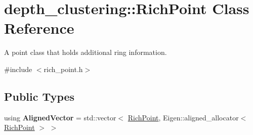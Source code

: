 \hypertarget{classdepth__clustering_1_1RichPoint}{}\section{depth\+\_\+clustering\+:\+:Rich\+Point Class Reference}
\label{classdepth__clustering_1_1RichPoint}


A point class that holds additional ring information.  




{\ttfamily \#include $<$rich\+\_\+point.\+h$>$}

\subsection*{Public Types}
\begin{DoxyCompactItemize}
\item 
\mbox{\label{classdepth__clustering_1_1RichPoint_a0c9f8f2afdb4f77c95cc1f6d17059d99}} 
using {\bfseries Aligned\+Vector} = std\+::vector$<$ \hyperlink{classdepth__clustering_1_1RichPoint}{Rich\+Point}, Eigen\+::aligned\+\_\+allocator$<$ \hyperlink{classdepth__clustering_1_1RichPoint}{Rich\+Point} $>$ $>$
\end{DoxyCompactItemize}
